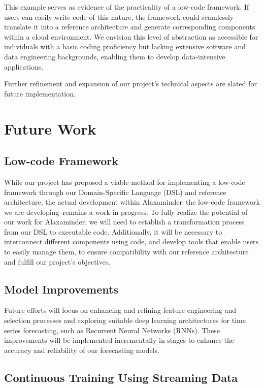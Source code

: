 \documentclass{report}
\begin{document}
This example serves as evidence of the practicality of a low-code framework. If users can easily write code of this nature, the framework could seamlessly translate it into a reference architecture and generate corresponding components within a cloud environment. We envision this level of abstraction as accessible for individuals with a basic coding proficiency but lacking extensive software and data engineering backgrounds, enabling them to develop data-intensive applications.

Further refinement and expansion of our project's technical aspects are slated for future implementation.


\section{Future Work}
\subsection{Low-code Framework}

 While our project has proposed a viable method for implementing a low-code framework through our Domain-Specific Language (DSL) and reference architecture, the actual development within Alaxaminder--the low-code framework we are developing--remains a work in progress. To fully realize the potential of our work for Alaxaminder, we will need to establish a transformation process from our DSL to executable code. Additionally, it will be necessary to interconnect different components using code, and develop tools that enable users to easily manage them, to ensure compatibility with our reference architecture and fulfill our project's objectives.

\subsection{Model Improvements}
 Future efforts will focus on enhancing and refining feature engineering and selection processes and exploring suitable deep learning architectures for time series forecasting, such as Recurrent Neural Networks (RNNs). These improvements will be implemented incrementally in stages to enhance the accuracy and reliability of our forecasting models.

\subsection{Continuous Training Using Streaming Data}
\end{document}
